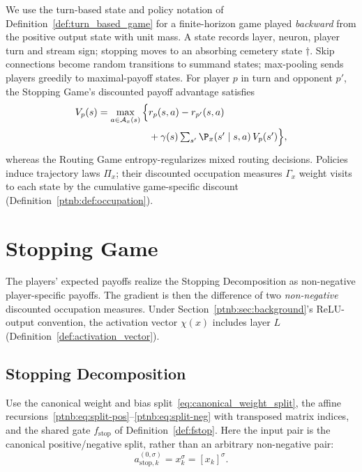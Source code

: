 We use the turn-based state and policy notation of Definition~\ref{def:turn_based_game} for a finite-horizon game played \emph{backward} from the positive output state with unit mass. A state records layer, neuron, player turn and stream sign;
stopping moves to an absorbing cemetery state $\dagger$. Skip connections become random transitions to
summand states; max-pooling sends players greedily to maximal-payoff states. For player $p$ in turn and opponent $p'$, the Stopping
Game's discounted payoff advantage satisfies
\begin{align}\label{ptnb:eq:bellman}
    V_p(s) = \max_{a \in \mathcal{A}_x(s)} \Big\{ &r_p(s,a) - r_{p'}(s,a) \nonumber\\
    &+ \gamma(s) \textstyle\sum_{s'} \P_x(s' \mid s,a)\, V_p(s') \Big\},
\end{align}
whereas the Routing Game entropy-regularizes mixed routing decisions. Policies induce trajectory
laws $\Pi_x$; their discounted occupation measures $\Gamma_x$ weight visits to each state by the
cumulative game-specific discount (Definition~\ref{ptnb:def:occupation}).


\section{Stopping Game}\label{ptnb:app:relu-net-game}\label{ptnb:app:adf-game}\label{ptnb:sec:stopping}\label{sec:stopping_game_reinterpretation}

The players' expected payoffs realize the Stopping Decomposition as non-negative player-specific payoffs. The gradient is then the
difference of two \emph{non-negative} discounted occupation measures. Under Section~\ref{ptnb:sec:background}'s
ReLU-output convention, the activation vector $\chi(x)$ includes layer $L$ (Definition~\ref{def:activation_vector}).

\subsection{Stopping Decomposition}\label{ptnb:app:dc-decomp}\label{ptnb:app:decompositions}

Use the canonical weight and bias split~\eqref{eq:canonical_weight_split}, the affine
recursions~\eqref{ptnb:eq:split-pos}--\eqref{ptnb:eq:split-neg} with transposed matrix indices, and
the shared gate $f_{\mathrm{stop}}$ of Definition~\ref{def:fstop}. Here the input pair is the
canonical positive/negative split, rather than an arbitrary non-negative pair:
\begin{equation}\label{ptnb:eq:input-split-convention}
    a_{\mathrm{stop},k}^{(0,\sigma)}=x_k^\sigma=[x_k]^\sigma.
\end{equation}

